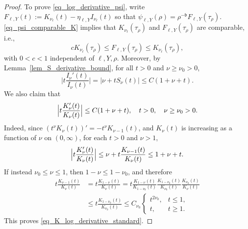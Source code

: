 \documentclass[12pt]{amsart}
\begin{document}
\begin{proof}
To prove \eqref{eq_log_derivative_psi}, write $F_{\ell,Y}(t):=K_{\nu_\ell}(t)-\eta_{\ell,Y}I_{\nu_\ell}(t)$ so that $\psi_{\ell,Y}(\rho)=\rho^{-\mathfrak b}F_{\ell,Y}(\tau_\rho)$.
\eqref{eq_psi_comparable_K} implies that $K_{\nu_\ell}(\tau_\rho)$ and $F_{\ell,Y}(\tau_\rho)$ are comparable, i.e.,
\begin{equation}\label{eq_F_comparable_K}
    cK_{\nu_\ell}(\tau_\rho)
    \le
    F_{\ell,Y}(\tau_\rho)
    \leq
    K_{\nu_\ell}(\tau_\rho),
\end{equation}
with $0<c<1$ independent of $\ell,Y,\rho$. Moreover, by Lemma~\ref{lem_S_derivative_bound}, for all $t>0$ and $\nu \ge \nu_0>0$,
\begin{equation}\label{eq_I_log_derivative_standard}
    \bigl|t\frac{I_\nu'(t)}{I_\nu(t)}\bigr|
    =
    \bigl| \nu + t S_{\nu}(t) \bigr|
    \le
    C(1+\nu+t).
\end{equation}
We also claim that
\begin{equation}\label{eq_K_log_derivative_standard}
    \Bigl|t\frac{K_\nu'(t)}{K_\nu(t)}\Bigr|
    \leq
    C(1+\nu+t),
    \quad
    t>0,\quad \nu\ge \nu_0>0.
\end{equation}
Indeed, since $(t^\nu K_\nu(t))'= -t^\nu K_{\nu-1}(t)$,
and $K_{\nu}(t)$ is increasing as a function of $\nu$ on $(0,\infty)$, for each $t>0$ and $\nu> 1$,
\begin{equation*}
\Bigl| t\frac{K_\nu'(t)}{K_\nu(t)} \Bigr| \le \nu + t \frac{K_{\nu-1}(t)}{K_\nu(t)} \le 1+\nu+t.
\end{equation*}
If instead $\nu_0 \le \nu \le 1$, then $1-\nu \le 1-\nu_0$, and therefore
\begin{align*}
    t\frac{K_{\nu-1}(t)}{K_{\nu}(t)}
    &=t \frac{K_{1-\nu}(t)}{K_{\nu}(t)}
    = t\frac{K_{1-\nu}(t)}{K_{1-\nu_0}(t)} \frac{K_{1-\nu_0}(t)}{K_{\nu_0}(t)} \frac{K_{\nu_0}(t)}{K_{\nu}(t)} \\
    &\le t\frac{K_{1-\nu_0}(t)}{K_{\nu_0}(t)}
    \le C_{\nu_0} \begin{cases}
        t^{2\nu_0}, & t\le 1,\\
        t, & t\ge 1.
    \end{cases}
\end{align*}
This proves \eqref{eq_K_log_derivative_standard}.


\end{proof}
\end{document}
